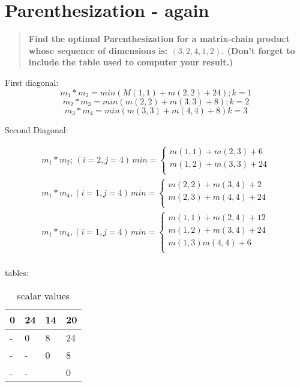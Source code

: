 \documentclass[titlepage]{article}\usepackage[]{graphicx}\usepackage[]{color}
\begin{document}
\section{Parenthesization - again }
\begin{quote}
 \textbf{ Find the optimal Parenthesization for a matrix-chain product whose sequence
  of dimensions is: $(3,2,4,1,2)$. (Don't forget to include the table used to
computer your result.)}
\end{quote}

First diagonal:
\[ m_1 * m_2 = min \left( M(1,1) + m(2,2) + 24\right); k=1 \]
\[ m_2 * m_3 = min \left( m(2,2) + m(3,3) + 8 \right); k=2 \]
\[ m_3 * m_4 = min \left( m(3,3) + m(4,4) + 8 \right) k =3 \]


Second Diagonal:

\begin{align*}
	m_1 * m_2;\, (i = 2, j=4)\, min =  \begin{cases} 
				m(1,1) + m(2,3) + 6 \\
				m(1,2) + m(3,3) + 24 \\ 
			\end{cases} \\
	m_1 * m_4 , (i=1, j=4)\, min = \begin{cases}
				m(2,2) + m(3,4) + 2 \\
				m(2,3) + m(4,4) + 24 \\
			\end{cases} \\
	m_1 * m_4, (i =1, j=4 )\, min = \begin{cases}
				m(1,1) + m(2,4) + 12 \\
				m(1,2) + m(3,4) + 24 \\
				m(1,3) m(4,4) + 6  \\
			\end{cases} \\
\end{align*}

tables:
\begin{table}[h]
	\caption{scalar values}
	\label{tab:mylabel}
	\begin{tabular}{|l|l|l|l|}
		\hline
		0 & 24 & 14 & 20 \\ \hline
		- & 0  & 8  & 24 \\ \hline
		- & -  & 0  & 8  \\ \hline
		- & -  &    & 0  \\ \hline
	\end{tabular}
\end{table}
\end{document}
